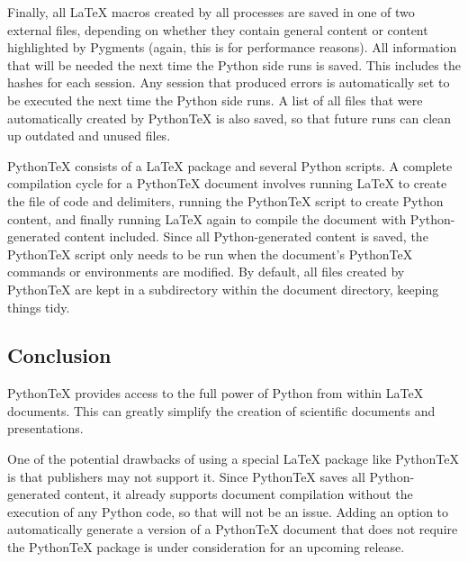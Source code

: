 \documentclass[letterpaper,compsoc,twoside]{IEEEtran}
\begin{document}
Finally, all LaTeX macros created by all processes are saved in
one of two external files, depending on whether they contain general
content or content highlighted by Pygments (again, this is for
performance reasons).  All information that will be needed the next
time the Python side runs is saved.  This includes the hashes for
each session.  Any session that produced errors is automatically set
to be executed the next time the Python side runs.  A list of all files
that were automatically created by PythonTeX is also saved, so
that future runs can clean up outdated and unused files.

PythonTeX consists of a LaTeX package and several Python scripts.
A complete compilation cycle for a PythonTeX document involves running
LaTeX to create the file of code and delimiters, running the PythonTeX
script to create Python content, and finally running LaTeX again
to compile the document with Python-generated content included.  Since
all Python-generated content is saved, the PythonTeX script only needs
to be run when the document's PythonTeX commands or environments are
modified.  By default, all files created by PythonTeX are kept in a
subdirectory within the document directory, keeping things tidy.

\subsection{Conclusion%
  \label{conclusion}%
}


PythonTeX provides access to the full power of Python from within
LaTeX documents.  This can greatly simplify the creation of scientific
documents and presentations.

One of the potential drawbacks of using a special LaTeX package
like PythonTeX is that publishers may not support it.  Since PythonTeX
saves all Python-generated content, it already supports document
compilation without the execution of any Python code, so that will
not be an issue.  Adding an option to automatically generate a version
of a PythonTeX document that does not require the PythonTeX package
is under consideration for an upcoming release.
\end{document}
